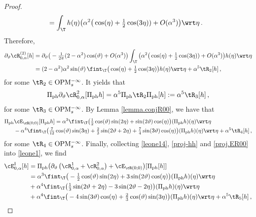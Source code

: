 \documentclass[a4paper,reqno,10pt]{article}
\newcommand{\pa}{\partial}
\newcommand{\OpM}{{\rm O}{\rm P}{\rm M}}
\begin{document}
\begin{proof}
\begin{align}
				& =  \int_{\T} h(\eta) \big( \alpha^2 \big( \cos(\eta) +  \tfrac{1}{2}\cos(3\eta) ) + O(\alpha^3) \big) \wrt \eta \,.
			\end{align}
			Therefore,
			\begin{align}
				\pa_{\vartheta}\cR_{0,\alpha}^{(2)}[h] & = \pa_{\vartheta}\big( - \tfrac{1}{2\pi}(2-\alpha^2) \cos(\vartheta) + O(\alpha^3) \big)     \int_{\T} \big( \alpha^2 \big( \cos(\eta) +  \tfrac{1}{2}\cos(3\eta) ) + O(\alpha^3) \big) h(\eta) \wrt \eta \\
				& =  (2-\alpha^2)\alpha^2 \sin(\vartheta)  \,  \fint_{\T} \big( \cos(\eta)+ \tfrac12\cos(3\eta)  \big) h(\eta) \wrt\eta  +\alpha^5 \tR_{2}[h] \,,\label{leone3}
			\end{align}
			for some $\tR_{2}\in\OpM_{s}^{-\infty}$. It yields that
			\begin{align}\label{proj-hh}
				\Pi_{\rm ph}\pa_{\vartheta} \cR_{0,\alpha}^{2}[\Pi_{\rm ph}h] = \alpha^5 \Pi_{\rm ph}\tR_{2}\Pi_{\rm ph}[h]:=\alpha^5\tR_{3}[h] \,,
			\end{align}
			for some $\tR_{3}\in\OpM_{s}^{-\infty}$. 
		By Lemma \ref{lemma.conjR00}, we have that
		\begin{align}
			\Pi_{\rm ph} & \cE_{\cR(0;0)} [\Pi_{\rm ph} h ] = \alpha^3\fint_{\T} \big( \tfrac12\cos(\vartheta) \sin(2\eta) +  \sin(2\vartheta) \cos(\eta)  \big)(\Pi_{\rm ph} h)(\eta) \wrt\eta \\
			& - \alpha^4 \fint_{\T} \big( \tfrac{7}{12} \cos(\vartheta) \sin(3\eta) + \tfrac{2}{3} \sin(2\vartheta+2\eta) + \tfrac{7}{4} \sin(3\vartheta) \cos(\eta) \big) (\Pi_{\rm ph} h)(\eta) \wrt\eta + \alpha^5 \tR_{4}[h]\,, \label{proj.ER00}
		\end{align}
		for some $\tR_{4}\in\OpM_{s}^{-\infty}$. Finally, collecting \eqref{leone14}, \eqref{proj-hh} and \eqref{proj.ER00} into \eqref{leone1}, we find
		\begin{align}
			\cE_{0,\alpha}^{\rm I}[h]& = \Pi_{\rm ph} \big( \pa_{\vartheta}\, \big( \cR_{0,\alpha}^{1} + \cR_{0,\alpha}^{2} \big)+\cE_{\cR(0;0)}   \big)[\Pi_{\rm ph} [h] ] \\
			& = \alpha^3 \fint_{\T} \big(-\tfrac12 \cos(\vartheta) \sin(2\eta)+3\sin(2\vartheta)\cos(\eta)\big) (\Pi_{\rm ph} h)(\eta) \wrt\eta \\
			& + \alpha^4 \fint_{\T}\big( \tfrac{1}{3} \sin(2\vartheta+2\eta)  -3\sin(2\vartheta-2\eta)\big) (\Pi_{\rm ph} h)(\eta) \wrt\eta \\
			\label{stepI}	&  + \alpha^4 \fint_{\T} \big(-4 \sin(3\vartheta)\cos(\eta) + \tfrac{2}{3} \cos(\vartheta) \sin(3\eta)  \big)(\Pi_{\rm ph} h)(\eta) \wrt\eta +\alpha^5 \tR_5[h]  \,,

\end{align}
\end{proof}
\end{document}
